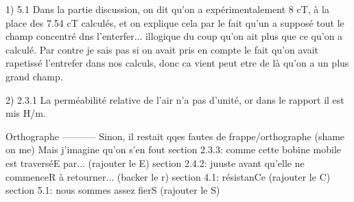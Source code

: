 
1) 5.1
Dans la partie discussion, on dit qu'on a expérimentalement 8 cT, à la place des 7.54 cT calculés, et on explique 
cela par le fait qu'un a supposé tout le champ concentré dns l'enterfer... illogique du coup qu'on ait plus que ce qu'on a calculé.
Par contre je sais pas si on avait pris en compte le fait qu'on avait rapetissé l'entrefer dans nos calculs, donc ca vient peut
etre de là qu'on a un plus grand champ.

2) 2.3.1
La perméabilité relative de l'air n'a pas d'unité, or dans le rapport il est mis H/m.

Orthographe
-----------
Sinon, il restait qqes fautes de frappe/orthographe (shame on me) Mais j'imagine qu'on s'en fout
section 2.3.3: comme cette bobine mobile est traverséE par... (rajouter le E)
section 2.4.2: juuste avant qu'elle ne commenceR à retourner... (backer le r)
section 4.1: résistanCe (rajouter le C)
section 5.1: nous sommes assez fierS (rajouter le S)

